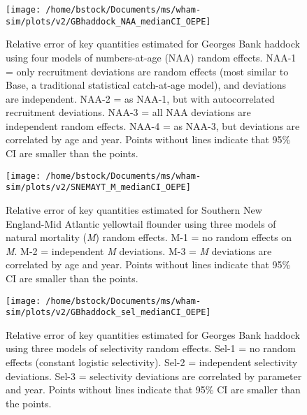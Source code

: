 \documentclass[]{article}
\begin{document}
\pagebreak

\begin{figure}

{\centering \texttt{[image: /home/bstock/Documents/ms/wham-sim/plots/v2/GBhaddock\_NAA\_medianCI\_OEPE]} 

}

\caption{Relative error of key quantities estimated for Georges Bank haddock using four models of numbers-at-age (NAA) random effects. NAA-1 = only recruitment deviations are random effects (most similar to Base, a traditional statistical catch-at-age model), and deviations are independent. NAA-2 = as NAA-1, but with autocorrelated recruitment deviations. NAA-3 = all NAA deviations are independent random effects. NAA-4 = as NAA-3, but deviations are correlated by age and year. Points without lines indicate that 95\% CI are smaller than the points.}\label{fig:rel-error-GBhaddock-naa}
\end{figure}

\pagebreak

\begin{figure}

{\centering \texttt{[image: /home/bstock/Documents/ms/wham-sim/plots/v2/SNEMAYT\_M\_medianCI\_OEPE]} 

}

\caption{Relative error of key quantities estimated for Southern New England-Mid Atlantic yellowtail flounder using three models of natural mortality (\textit{M}) random effects. M-1 = no random effects on \textit{M}. M-2 = independent \textit{M} deviations. M-3 = \textit{M} deviations are correlated by age and year. Points without lines indicate that 95\% CI are smaller than the points.}\label{fig:rel-error-snemayt-m}
\end{figure}

\pagebreak

\begin{figure}

{\centering \texttt{[image: /home/bstock/Documents/ms/wham-sim/plots/v2/GBhaddock\_sel\_medianCI\_OEPE]} 

}

\caption{Relative error of key quantities estimated for Georges Bank haddock using three models of selectivity random effects. Sel-1 = no random effects (constant logistic selectivity). Sel-2 = independent selectivity deviations. Sel-3 = selectivity deviations are correlated by parameter and year. Points without lines indicate that 95\% CI are smaller than the points.}\label{fig:rel-error-GBhaddock-sel}
\end{figure}
\end{document}
